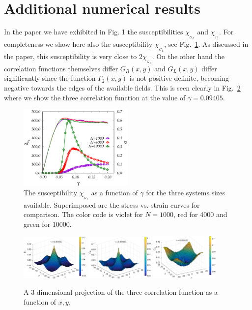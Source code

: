 \documentclass[aps,pnas,float]{revtex4}
\begin{document}
\section{Additional numerical results}

In the paper we have exhibited in Fig. 1 the susceptibilities $\chi_{_{G_R}}$ and $\chi_{_{\Gamma_2}}$. For
completeness we show here also the susceptibility $\chi_{_{G_L}}$, see Fig.~\ref{GL}.
As discussed in the paper, this susceptibility is very close to 2$\chi_{_{G_R}}$. On the other hand
the correlation functions themselves differ $G_R(x,y)$ and $G_L(x,y)$ differ significantly since
the function $\Gamma_2(x,y)$ is not positive definite, becoming negative towards the edges of the
available fields. This is seen clearly in Fig.~\ref{correlations} where we show the three
correlation function at the value of $\gamma=0.09405$.
\begin{figure}[htpb]
 \includegraphics[width=0.5\textwidth]{spinodalSIFig1.eps}
 \caption{The susceptibility $\chi_{_{G_L}}$  as a function of $\gamma$ for the three systems sizes available. Superimposed are the stress vs. strain curves for comparison.
 The color code is violet for $N=1000$, red for 4000 and green for 10000.}  \label{GL}
\end{figure}
\begin{figure}[htpb]
 \includegraphics[width=0.3\textwidth]{spinodalSIFig2a.eps}
 \includegraphics[width=0.3\textwidth]{spinodalSIFig2b.eps}
 \includegraphics[width=0.3\textwidth]{spinodalSIFig2c.eps}\\
 \caption{A 3-dimensional projection of the three correlation function as a function of $x,y$.}
 \label{correlations}
 \end{figure}
\end{document}
